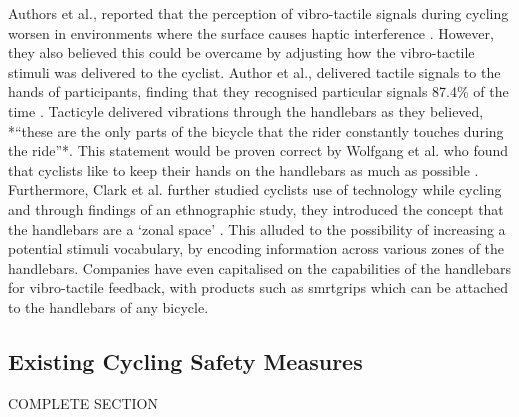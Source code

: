 \documentclass{interim}
\begin{document}
Authors et al., reported that the perception of vibro-tactile signals during cycling worsen in environments where the surface causes haptic interference \cite{erdei2020comparing, doi:10.1080/15389588.2021.1985113}. However, they also believed this could be overcame by adjusting how the vibro-tactile stimuli was delivered to the cyclist. Author et al., delivered tactile signals to the hands of participants, finding that they recognised particular signals 87.4\% of the time \cite{10.1145/1979742.1979760}. Tacticyle \cite{10.1145/2371574.2371631} delivered vibrations through the handlebars as they believed, *“these are the only parts of the bicycle that the rider constantly touches during the ride”*. This statement would be proven correct by Wolfgang et al. who found that cyclists like to keep their hands on the handlebars as much as possible \cite{10.1145/3152832.3152871}. Furthermore, Clark et al. further studied cyclists use of technology while cycling and through findings of an ethnographic study, they introduced the concept that the handlebars are a ‘zonal space’ \cite{10.1145/3544548.3580971}. This alluded to the possibility of increasing a potential stimuli vocabulary, by encoding information across various zones of the handlebars. Companies have even capitalised on the capabilities of the handlebars for vibro-tactile feedback, with products such as smrtgrips \cite{smartgrips} which can be attached to the handlebars of any bicycle.

\subsection{Existing Cycling Safety Measures}
COMPLETE SECTION
\end{document}
